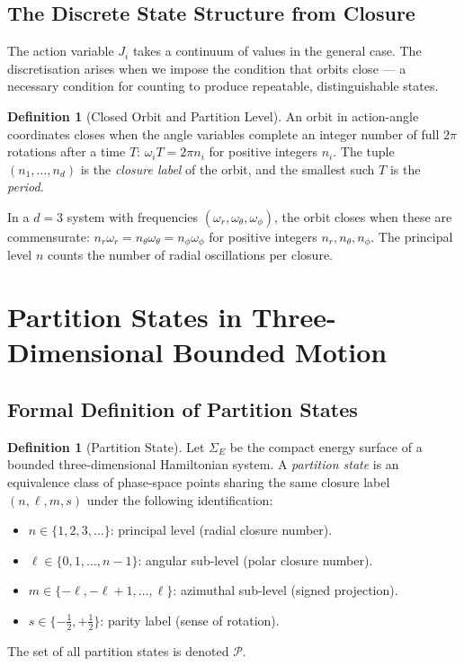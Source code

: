 \documentclass[twocolumn,10pt,a4paper]{article}
\theoremstyle{thmstyle}
\theoremstyle{definition}
\newtheorem{definition}[theorem]{Definition}
\theoremstyle{remark}
\newcommand{\Parts}{\mathcal{P}}
\begin{document}
\subsection{The Discrete State Structure from Closure}

The action variable $J_i$ takes a continuum of values in the general case. The discretisation arises when we impose the condition that orbits close --- a necessary condition for counting to produce repeatable, distinguishable states.

\begin{definition}[Closed Orbit and Partition Level]
\label{def:closure}
An orbit in action-angle coordinates closes when the angle variables complete an integer number of full $2\pi$ rotations after a time $T$: $\omega_i T = 2\pi n_i$ for positive integers $n_i$. The tuple $(n_1, \ldots, n_d)$ is the \emph{closure label} of the orbit, and the smallest such $T$ is the \emph{period}.
\end{definition}

In a $d=3$ system with frequencies $(\omega_r, \omega_\theta, \omega_\phi)$, the orbit closes when these are commensurate: $n_r \omega_r = n_\theta \omega_\theta = n_\phi \omega_\phi$ for positive integers $n_r, n_\theta, n_\phi$. The principal level $n$ counts the number of radial oscillations per closure.

\section{Partition States in Three-Dimensional Bounded Motion}
\label{sec:partition}

\subsection{Formal Definition of Partition States}

\begin{definition}[Partition State]
\label{def:part-state}
Let $\Sigma_E$ be the compact energy surface of a bounded three-dimensional Hamiltonian system. A \emph{partition state} is an equivalence class of phase-space points sharing the same closure label $(n, \ell, m, s)$ under the following identification:
\begin{itemize}[leftmargin=1.2em,itemsep=0.1em]
\item $n \in \{1, 2, 3, \ldots\}$: principal level (radial closure number).
\item $\ell \in \{0, 1, \ldots, n-1\}$: angular sub-level (polar closure number).
\item $m \in \{-\ell, -\ell+1, \ldots, \ell\}$: azimuthal sub-level (signed projection).
\item $s \in \{-\tfrac{1}{2}, +\tfrac{1}{2}\}$: parity label (sense of rotation).
\end{itemize}
The set of all partition states is denoted $\Parts$.
\end{definition}
\end{document}
